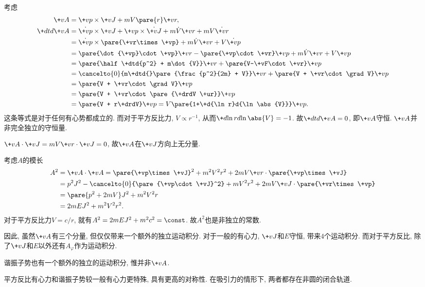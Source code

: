 \documentclass[../LectureNotes.tex]{subfiles}
\begin{document}
考虑
\begin{align*}
    \+vA &= \+vp \times \+vJ + mV\pare{r} \+vr,\\
    \+dtd{\+vA} &= \dot{\+vp}\times\+vJ + \+vp\times\dot{\+vJ} + m\dot{V}\+vr + mV\dot{\+vr} \\
    &= \dot{\+vp}\times\pare{\+vr\times\+vp} + m\dot{V}\+vr + V\dot{\+vp} \\
    &= \pare{\dot{\+vp}\cdot\+vp}\+vr - \pare{\+vp\cdot\+vr}\+vp + m\dot{V}\+vr + V\+vp \\
    &= \pare{\half \+dtd{p^2} + m\dot{V}}\+vr + \pare{V-\+vF\cdot\+vr}\+vp \\
    &= \cancelto{0}{m\+dtd{}\pare{\frac{p^2}{2m} + V}}\+vr + \pare{V + \+vr\cdot\grad V}\+vp \\
    &= \pare{V + \+vr\cdot\grad V}\+vp \\
    &= \pare{V + \+vr\cdot\pare{\+drdV \+ur}}\+vp \\
    &= \pare{V + r\+drdV}\+vp = V\pare{1+\+d{\ln r}d{\ln \abs{V}}}\+vp.
\end{align*}
这条等式是对于任何有心势都成立的. 而对于平方反比力, $V\propto r^{-1}$, 从而$\displaystyle \+d{\ln r}d{\ln\abs{V}} = -1$. 故$\displaystyle \+dtd{\+vA} = 0$, 即$\+vA$守恒. $\+vA$并非完全独立的守恒量.
\begin{cenum}
    \item $\+vA\cdot\+vJ = mV\+vr\cdot\+vJ = 0$, 故$\+vA$在$\+vJ$方向上无分量.
    \item 考虑$A$的模长
    \begin{align*}
        A^2 &= \+vA\cdot \+vA = \pare{\+vp\times\+vJ}^2 + m^2V^2r^2 + 2mV\+vr\cdot\pare{\+vp\times\+vJ} \\
        &= p^2J^2 - \cancelto{0}{\pare{\+vp\cdot\+vJ}^2} + mV^2r^2 + 2mV\+vJ\cdot\pare{\+vr\times\+vp} \\
        &= \pare{p^2 + 2mV}J^2 + m^2V^2 r \\
        &= 2mEJ^2 + m^2V^2r^2.
    \end{align*}
    对于平方反比力$V = c/r$, 就有$A^2 = 2mEJ^2 + m^2c^2 = \const$. 故$A^2$也是非独立的常数.
\end{cenum}
因此, 虽然$\+vA$有三个分量, 但仅仅带来一个额外的独立运动积分. 对于一般的有心力, $\+vJ$和$E$守恒, 带来$4$个运动积分. 而对于平方反比, 除了$\+vJ$和$E$以外还有$A_\varphi$作为运动积分.
\begin{remark}
    谐振子势也有一个额外的独立的运动积分, 惟并非$\+vA$.
\end{remark}
平方反比有心力和谐振子势较一般有心力更特殊, 具有更高的对称性. 在吸引力的情形下, 两者都存在非圆的闭合轨道.
\end{document}

